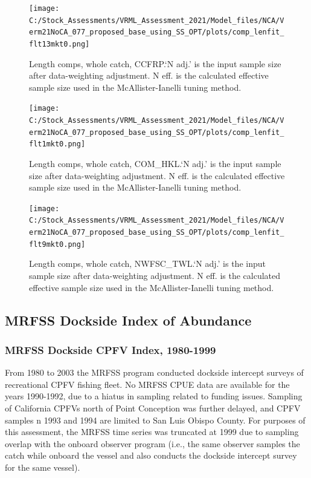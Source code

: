 \documentclass[
  english,
  a4paper,
]{article}
\begin{document}
\begin{figure}
\centering
\texttt{[image: C:/Stock\_Assessments/VRML\_Assessment\_2021/Model\_files/NCA/Verm21NoCA\_077\_proposed\_base\_using\_SS\_OPT/plots/comp\_lenfit\_flt13mkt0.png]}
\caption{Length comps, whole catch, CCFRP.`N adj.' is the input sample size after data-weighting adjustment. N eff. is the calculated effective sample size used in the McAllister-Ianelli tuning method.\label{fig:comp_lenfit_flt13mkt0}}
\end{figure}

\begin{figure}
\centering
\texttt{[image: C:/Stock\_Assessments/VRML\_Assessment\_2021/Model\_files/NCA/Verm21NoCA\_077\_proposed\_base\_using\_SS\_OPT/plots/comp\_lenfit\_flt1mkt0.png]}
\caption{Length comps, whole catch, COM\_HKL.`N adj.' is the input sample size after data-weighting adjustment. N eff. is the calculated effective sample size used in the McAllister-Ianelli tuning method.\label{fig:comp_lenfit_flt1mkt0}}
\end{figure}

\begin{figure}
\centering
\texttt{[image: C:/Stock\_Assessments/VRML\_Assessment\_2021/Model\_files/NCA/Verm21NoCA\_077\_proposed\_base\_using\_SS\_OPT/plots/comp\_lenfit\_flt9mkt0.png]}
\caption{Length comps, whole catch, NWFSC\_TWL.`N adj.' is the input sample size after data-weighting adjustment. N eff. is the calculated effective sample size used in the McAllister-Ianelli tuning method.\label{fig:comp_lenfit_flt9mkt0}}
\end{figure}

\clearpage

\hypertarget{mrfss-index}{%
\subsection{MRFSS Dockside Index of Abundance}\label{mrfss-index}}

\hypertarget{mrfss-dockside-cpfv-index-1980-1999}{%
\subsubsection{MRFSS Dockside CPFV Index, 1980-1999}\label{mrfss-dockside-cpfv-index-1980-1999}}

From 1980 to 2003 the MRFSS program conducted dockside intercept surveys of
recreational CPFV fishing fleet. No MRFSS CPUE data are available for the years
1990-1992, due to a hiatus in sampling related to funding issues. Sampling of
California CPFVs north of Point Conception was further delayed, and CPFV samples
n 1993 and 1994 are limited to San Luis Obispo County.
For purposes of this assessment, the MRFSS time series was truncated at 1999 due
to sampling overlap with the
onboard observer program (i.e., the same observer samples the catch while
onboard the vessel and also conducts the dockside intercept survey for
the same vessel).
\end{document}
